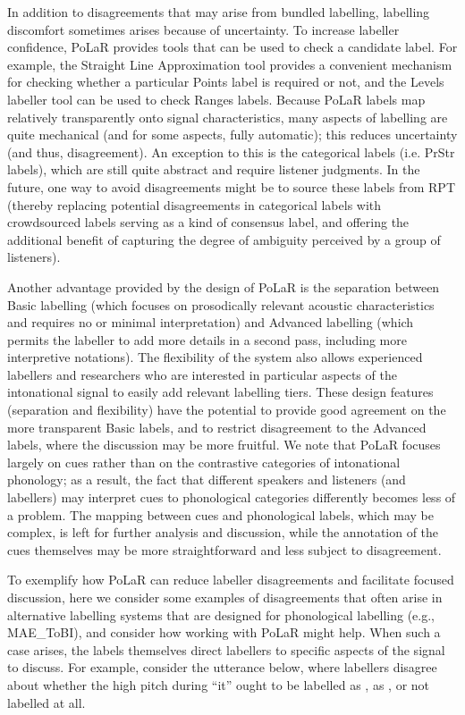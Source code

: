 In addition to disagreements that may arise from bundled labelling, labelling discomfort sometimes arises because of uncertainty.  To increase labeller confidence, PoLaR provides tools that can be used to check a candidate label.  For example, the Straight Line Approximation tool provides a convenient mechanism for checking whether a particular Points label is required or not, and the Levels labeller tool can be used to check Ranges labels.  Because PoLaR labels map relatively transparently onto signal characteristics, many aspects of labelling are quite mechanical (and for some aspects, fully automatic); this reduces uncertainty (and thus, disagreement). An exception to this is the categorical labels (i.e. PrStr labels), which are still quite abstract and require listener judgments. In the future, one way to avoid disagreements might be to source these labels from RPT (thereby replacing potential disagreements in categorical labels with crowdsourced labels serving as a kind of consensus label, and offering the additional benefit of capturing the degree of ambiguity perceived by a group of listeners). 

Another advantage provided by the design of PoLaR is the separation between Basic labelling (which focuses on prosodically relevant acoustic characteristics and requires no or minimal interpretation) and Advanced labelling (which permits the labeller to add more details in a second pass, including more interpretive notations). The flexibility of the system also allows experienced labellers and researchers who are interested in particular aspects of the intonational signal to easily add relevant labelling tiers.  These design features (separation and flexibility) have the potential to provide good agreement on the more transparent Basic labels, and to restrict disagreement to the Advanced labels, where the discussion may be more fruitful.  We note that PoLaR focuses largely on cues rather than on the contrastive categories of intonational phonology; as a result, the fact that different speakers and listeners (and labellers) may interpret cues to phonological categories differently becomes less of a problem.  The mapping between cues and phonological labels, which may be complex, is left for further analysis and discussion, while the annotation of the cues themselves may be more straightforward and less subject to disagreement.

To exemplify how PoLaR can reduce labeller disagreements and facilitate focused discussion, here we consider some examples of disagreements that often arise in alternative labelling systems that are designed for phonological labelling (e.g., MAE\_ToBI), and consider how working with PoLaR might help. When such a case arises, the labels themselves direct labellers to specific aspects of the signal to discuss. For example, consider the utterance below, where labellers disagree about whether the high pitch during “it” ought to be labelled as , as , or not labelled at all.

